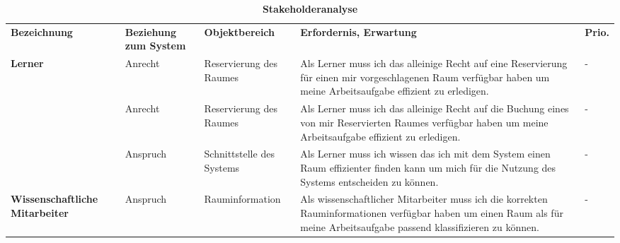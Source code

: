 \begin{table}[h]
	
 	\caption{\textbf{Stakeholderanalyse}}
 	\begin{tabularx}{\textwidth}{|X|X|X|X|m{}|}			
 		\rowcolor{heading}\textbf{Bezeichnung} & \textbf{Beziehung zum System} & \textbf{Objektbereich} & \textbf{Erfordernis, Erwartung} & \textbf{Prio.}\\
			 
 	\textbf{Lerner} & Anrecht & Reservierung des Raumes & Als Lerner muss ich das alleinige Recht auf eine Reservierung für einen mir vorgeschlagenen Raum verfügbar haben um meine Arbeitsaufgabe effizient zu erledigen. & -\\
\rowcolor{odd}		 & Anrecht & Reservierung des Raumes & Als Lerner muss ich das alleinige Recht auf die Buchung eines von mir Reservierten Raumes verfügbar haben um meine Arbeitsaufgabe effizient zu erledigen. & -\\
	& Anspruch & Schnittstelle des Systems & Als Lerner muss ich wissen das ich mit dem System einen Raum effizienter finden kann um mich für die Nutzung des Systems entscheiden zu können. & -\\
\rowcolor{odd} \textbf{Wissenschaftliche Mitarbeiter} & Anspruch & Rauminformation & Als wissenschaftlicher Mitarbeiter muss ich die korrekten Rauminformationen verfügbar haben um einen Raum als für meine Arbeitsaufgabe passend klassifizieren zu können. & -\\ \hline
 	\end{tabularx}
 	
\end{table}


